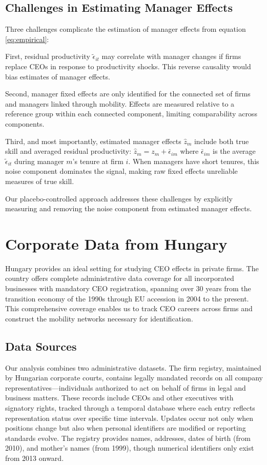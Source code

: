 \documentclass[11pt,a4paper]{article}
\begin{document}
\subsection{Challenges in Estimating Manager Effects}

Three challenges complicate the estimation of manager effects from equation \eqref{eq:empirical}:

First, residual productivity $\tilde{\epsilon}_{it}$ may correlate with manager changes if firms replace CEOs in response to productivity shocks. This reverse causality would bias estimates of manager effects.

Second, manager fixed effects are only identified for the connected set of firms and managers linked through mobility. Effects are measured relative to a reference group within each connected component, limiting comparability across components.

Third, and most importantly, estimated manager effects $\hat{z}_m$ include both true skill and averaged residual productivity: $\hat{z}_m = z_m + \bar{\epsilon}_{im}$ where $\bar{\epsilon}_{im}$ is the average $\tilde{\epsilon}_{it}$ during manager $m$'s tenure at firm $i$. When managers have short tenures, this noise component dominates the signal, making raw fixed effects unreliable measures of true skill.

Our placebo-controlled approach addresses these challenges by explicitly measuring and removing the noise component from estimated manager effects.

\section{Corporate Data from Hungary}

Hungary provides an ideal setting for studying CEO effects in private firms. The country offers complete administrative data coverage for all incorporated businesses with mandatory CEO registration, spanning over 30 years from the transition economy of the 1990s through EU accession in 2004 to the present. This comprehensive coverage enables us to track CEO careers across firms and construct the mobility networks necessary for identification.

\subsection{Data Sources}

Our analysis combines two administrative datasets. The firm registry, maintained by Hungarian corporate courts, contains legally mandated records on all company representatives—individuals authorized to act on behalf of firms in legal and business matters. These records include CEOs and other executives with signatory rights, tracked through a temporal database where each entry reflects representation status over specific time intervals. Updates occur not only when positions change but also when personal identifiers are modified or reporting standards evolve. The registry provides names, addresses, dates of birth (from 2010), and mother's names (from 1999), though numerical identifiers only exist from 2013 onward.
\end{document}
